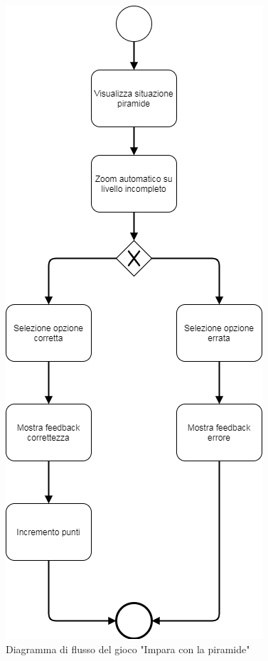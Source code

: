 \begin{figure}[htbp]
\centering
\includegraphics[scale=0.6]{Images/Flussopiramide}
\caption{Diagramma di flusso del gioco "Impara con la piramide"}
\label{fig:Diagramma di flusso del gioco "Impara con la piramide}
\end{figure}
\clearpage


